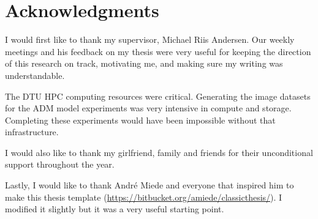 




\begingroup
\let\clearpage\relax
\let\cleardoublepage\relax
\let\cleardoublepage\relax
\chapter*{Acknowledgments}



I would first like to thank my supervisor, Michael Riis Andersen. Our weekly meetings and his feedback on my thesis were very useful for keeping the direction of this research on track, motivating me, and making sure my writing was understandable.

The DTU HPC computing resources were critical. Generating the image datasets for the ADM model experiments was very intensive in compute and storage. Completing these experiments would have been impossible without that infrastructure.

I would also like to thank my girlfriend, family and friends for their unconditional support throughout the year.

Lastly, I would like to thank André Miede and everyone that inspired him to make this thesis template (\url{https://bitbucket.org/amiede/classicthesis/}). I modified it slightly but it was a very useful starting point.




\endgroup
